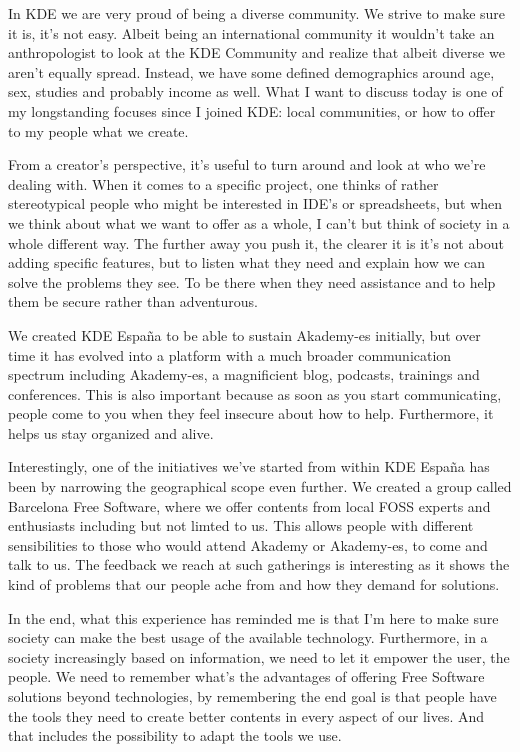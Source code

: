 
\noindent{}In KDE we are very proud of being a diverse community. We strive to make sure it is, it's not easy. Albeit being an international community it wouldn't take an anthropologist to look at the KDE Community and realize that albeit diverse we aren't equally spread. Instead, we have some defined demographics around age, sex, studies and probably income as well. What I want to discuss today is one of my longstanding focuses since I joined KDE: local communities, or how to offer to my people what we create.

From a creator's perspective, it's useful to turn around and look at who we're dealing with. When it comes to a specific project, one thinks of rather stereotypical people who might be interested in IDE's or spreadsheets, but when we think about what we want to offer as a whole, I can't but think of society in a whole different way. The further away you push it, the clearer it is it's not about adding specific features, but to listen what they need and explain how we can solve the problems they see. To be there when they need assistance and to help them be secure rather than adventurous.

We created KDE España to be able to sustain Akademy-es initially, but over time it has evolved into a platform with a much broader communication spectrum including Akademy-es, a magnificient blog, podcasts, trainings and conferences. This is also important because as soon as you start communicating, people come to you when they feel insecure about how to help. Furthermore, it helps us stay organized and alive.

Interestingly, one of the initiatives we've started from within KDE España has been by narrowing the geographical scope even further. We created a group called Barcelona Free Software, where we offer contents from local FOSS experts and enthusiasts including but not limted to us. This allows people with different sensibilities to those who would attend Akademy or Akademy-es, to come and talk to us. The feedback we reach at such gatherings is interesting as it shows the kind of problems that our people ache from and how they demand for solutions.

In the end, what this experience has reminded me is that I'm here to make sure society can make the best usage of the available technology. Furthermore, in a society increasingly based on information, we need to let it empower the user, the people. We need to remember what's the advantages of offering Free Software solutions beyond technologies, by remembering the end goal is that people have the tools they need to create better contents in every aspect of our lives. And that includes the possibility to adapt the tools we use.

